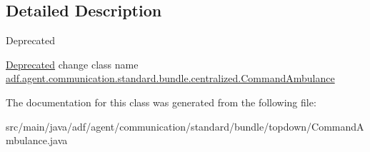 \subsection{Detailed Description}
\begin{DoxyRefDesc}{Deprecated}
\item[\hyperlink{deprecated__deprecated000001}{Deprecated}]change class name \hyperlink{classadf_1_1agent_1_1communication_1_1standard_1_1bundle_1_1centralized_1_1CommandAmbulance}{adf.\+agent.\+communication.\+standard.\+bundle.\+centralized.\+Command\+Ambulance} \end{DoxyRefDesc}


The documentation for this class was generated from the following file\+:\begin{DoxyCompactItemize}
\item 
src/main/java/adf/agent/communication/standard/bundle/topdown/Command\+Ambulance.\+java\end{DoxyCompactItemize}
